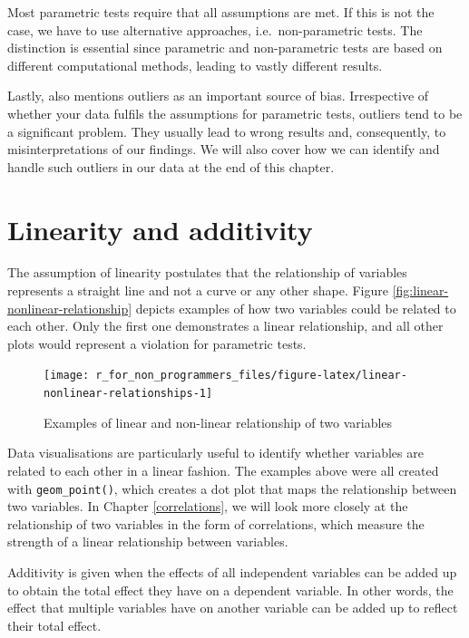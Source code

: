 \documentclass[
]{book}
\begin{document}
Most parametric tests require that all assumptions are met. If this is not the case, we have to use alternative approaches, i.e.~non-parametric tests. The distinction is essential since parametric and non-parametric tests are based on different computational methods, leading to vastly different results.

Lastly, \citet{field2013discovering} also mentions outliers as an important source of bias. Irrespective of whether your data fulfils the assumptions for parametric tests, outliers tend to be a significant problem. They usually lead to wrong results and, consequently, to misinterpretations of our findings. We will also cover how we can identify and handle such outliers in our data at the end of this chapter.

\hypertarget{additivity-and-linearity}{%
\section{Linearity and additivity}\label{additivity-and-linearity}}

The assumption of linearity postulates that the relationship of variables represents a straight line and not a curve or any other shape. Figure \ref{fig:linear-nonlinear-relationship} depicts examples of how two variables could be related to each other. Only the first one demonstrates a linear relationship, and all other plots would represent a violation for parametric tests.

\begin{figure}

{\centering \texttt{[image: r\_for\_non\_programmers\_files/figure-latex/linear-nonlinear-relationships-1]} 

}

\caption{Examples of linear and non-linear relationship of two variables}\label{fig:linear-nonlinear-relationships}
\end{figure}

Data visualisations are particularly useful to identify whether variables are related to each other in a linear fashion. The examples above were all created with \texttt{geom\_point()}, which creates a dot plot that maps the relationship between two variables. In Chapter \ref{correlations}, we will look more closely at the relationship of two variables in the form of correlations, which measure the strength of a linear relationship between variables.

Additivity is given when the effects of all independent variables can be added up to obtain the total effect they have on a dependent variable. In other words, the effect that multiple variables have on another variable can be added up to reflect their total effect.
\end{document}
